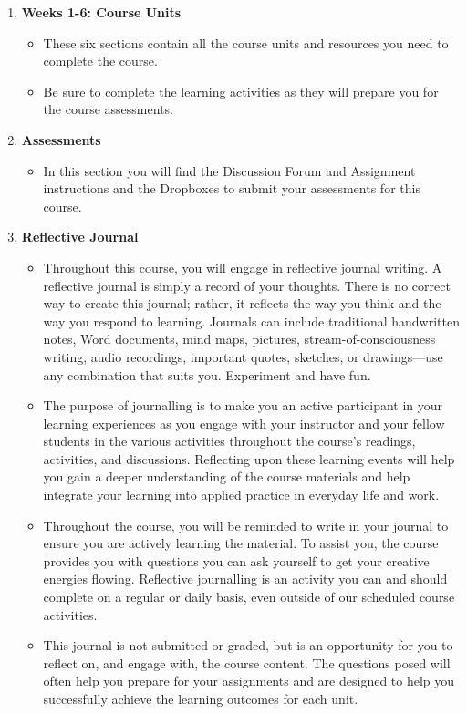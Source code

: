 \documentclass[
  letterpaper,
  DIV=11,
  numbers=noendperiod]{scrreprt}
\providecommand{\tightlist}{%
  \setlength{\itemsep}{0pt}\setlength{\parskip}{0pt}}\usepackage{longtable,booktabs,array}
\begin{document}
\begin{enumerate}
\def\labelenumi{\arabic{enumi}.}
\setcounter{enumi}{1}
\tightlist
\item
  \textbf{Weeks 1-6: Course Units}

  \begin{itemize}
  \tightlist
  \item
    These six sections contain all the course units and resources you
    need to complete the course.
  \item
    Be sure to complete the learning activities as they will prepare you
    for the course assessments.
  \end{itemize}
\item
  \textbf{Assessments}

  \begin{itemize}
  \tightlist
  \item
    In this section you will find the Discussion Forum and Assignment
    instructions and the Dropboxes to submit your assessments for this
    course.
  \end{itemize}
\item
  \textbf{Reflective Journal}

  \begin{itemize}
  \tightlist
  \item
    Throughout this course, you will engage in reflective journal
    writing. A reflective journal is simply a record of your thoughts.
    There is no correct way to create this journal; rather, it reflects
    the way you think and the way you respond to learning. Journals can
    include traditional handwritten notes, Word documents, mind maps,
    pictures, stream-of-consciousness writing, audio recordings,
    important quotes, sketches, or drawings---use any combination that
    suits you. Experiment and have fun.
  \item
    The purpose of journalling is to make you an active participant in
    your learning experiences as you engage with your instructor and
    your fellow students in the various activities throughout the
    course's readings, activities, and discussions. Reflecting upon
    these learning events will help you gain a deeper understanding of
    the course materials and help integrate your learning into applied
    practice in everyday life and work.
  \item
    Throughout the course, you will be reminded to write in your journal
    to ensure you are actively learning the material. To assist you, the
    course provides you with questions you can ask yourself to get your
    creative energies flowing. Reflective journalling is an activity you
    can and should complete on a regular or daily basis, even outside of
    our scheduled course activities.
  \item
    This journal is not submitted or graded, but is an opportunity for
    you to reflect on, and engage with, the course content. The
    questions posed will often help you prepare for your assignments and
    are designed to help you successfully achieve the learning outcomes
    for each unit.
  \end{itemize}
\end{enumerate}
\end{document}
